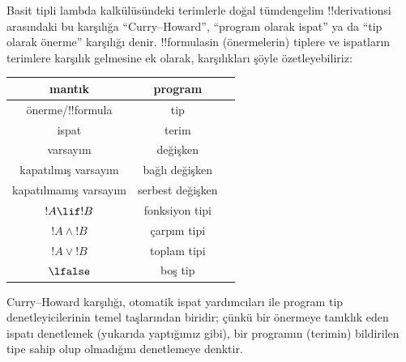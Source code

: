 \documentclass[../../../include/open-logic-section]{subfiles}
\begin{document}
Basit tipli lambda kalkülüsündeki terimlerle doğal tümdengelim
!!{derivation}s{}i arasındaki bu karşılığa ``Curry--Howard'', ``program olarak
ispat'' ya da ``tip olarak önerme'' karşılığı denir. !!{formula}s{}in
(önermelerin) tiplere ve ispatların terimlere karşılık gelmesine ek olarak,
karşılıkları şöyle özetleyebiliriz:
\begin{center}
  \begin{tabular}{c c c}
    mantık & program \\
    \hline
    önerme/!!{formula} & tip \\
    ispat & terim \\
    varsayım & değişken \\
    kapatılmış varsayım & bağlı değişken \\
    kapatılmamış varsayım & serbest değişken \\
    $!A \lif !B$ & fonksiyon tipi \\
    $!A \land !B$ & çarpım tipi \\
    $!A \lor !B$ & toplam tipi \\
    $\lfalse$ & boş tip \\
    \hline
  \end{tabular}
\end{center}

Curry--Howard karşılığı, otomatik ispat yardımcıları ile program tip
denetleyicilerinin temel taşlarından biridir; çünkü bir önermeye tanıklık
eden ispatı denetlemek (yukarıda yaptığımız gibi), bir programın (terimin)
bildirilen tipe sahip olup olmadığını denetlemeye denktir.
\end{document}

